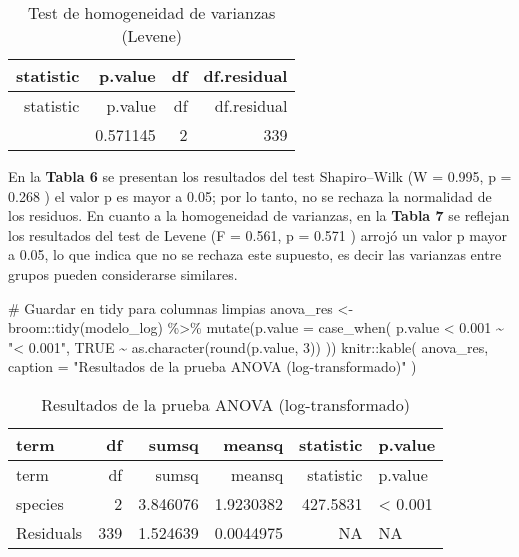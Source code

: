 \documentclass[
  spanish,
  11pt,
  a4paper,
  DIV=11,
  numbers=noendperiod]{scrartcl}
\newenvironment{Shaded}{\begin{snugshade}}{\end{snugshade}}
\newcommand{\AttributeTok}[1]{\textcolor[rgb]{0.40,0.45,0.13}{#1}}
\newcommand{\CommentTok}[1]{\textcolor[rgb]{0.37,0.37,0.37}{#1}}
\newcommand{\ConstantTok}[1]{\textcolor[rgb]{0.56,0.35,0.01}{#1}}
\newcommand{\DecValTok}[1]{\textcolor[rgb]{0.68,0.00,0.00}{#1}}
\newcommand{\FloatTok}[1]{\textcolor[rgb]{0.68,0.00,0.00}{#1}}
\newcommand{\FunctionTok}[1]{\textcolor[rgb]{0.28,0.35,0.67}{#1}}
\newcommand{\NormalTok}[1]{\textcolor[rgb]{0.00,0.23,0.31}{#1}}
\newcommand{\OtherTok}[1]{\textcolor[rgb]{0.00,0.23,0.31}{#1}}
\newcommand{\SpecialCharTok}[1]{\textcolor[rgb]{0.37,0.37,0.37}{#1}}
\newcommand{\StringTok}[1]{\textcolor[rgb]{0.13,0.47,0.30}{#1}}
\begin{document}
\begin{longtable}[]{@{}rrrr@{}}
\caption{Test de homogeneidad de varianzas (Levene)}\tabularnewline
\toprule\noalign{}
statistic & p.value & df & df.residual \\
\midrule\noalign{}
\endfirsthead
\toprule\noalign{}
statistic & p.value & df & df.residual \\
\midrule\noalign{}
\endhead
\bottomrule\noalign{}
\endlastfoot
0.5610386 & 0.571145 & 2 & 339 \\
\end{longtable}

En la \textbf{Tabla 6} se presentan los resultados del test
Shapiro--Wilk (W = 0.995, p = 0.268 ) el valor p es mayor a 0.05; por lo
tanto, no se rechaza la normalidad de los residuos. En cuanto a la
homogeneidad de varianzas, en la \textbf{Tabla 7} se reflejan los
resultados del test de Levene (F = 0.561, p = 0.571 ) arrojó un valor p
mayor a 0.05, lo que indica que no se rechaza este supuesto, es decir
las varianzas entre grupos pueden considerarse similares.

\begin{Shaded}
\begin{Highlighting}[numbers=left,,]
\CommentTok{\# Guardar en tidy para columnas limpias}
\NormalTok{anova\_res }\OtherTok{\textless{}{-}}\NormalTok{ broom}\SpecialCharTok{::}\FunctionTok{tidy}\NormalTok{(modelo\_log) }\SpecialCharTok{\%\textgreater{}\%}
  \FunctionTok{mutate}\NormalTok{(}\AttributeTok{p.value =} \FunctionTok{case\_when}\NormalTok{(}
\NormalTok{    p.value }\SpecialCharTok{\textless{}} \FloatTok{0.001} \SpecialCharTok{\textasciitilde{}} \StringTok{"\textless{} 0.001"}\NormalTok{,}
    \ConstantTok{TRUE} \SpecialCharTok{\textasciitilde{}} \FunctionTok{as.character}\NormalTok{(}\FunctionTok{round}\NormalTok{(p.value, }\DecValTok{3}\NormalTok{))}
\NormalTok{  ))}
\NormalTok{knitr}\SpecialCharTok{::}\FunctionTok{kable}\NormalTok{(}
\NormalTok{  anova\_res,}
  \AttributeTok{caption =} \StringTok{"Resultados de la prueba ANOVA (log{-}transformado)"}
\NormalTok{)}
\end{Highlighting}
\end{Shaded}

\begin{longtable}[]{@{}lrrrrl@{}}
\caption{Resultados de la prueba ANOVA
(log-transformado)}\tabularnewline
\toprule\noalign{}
term & df & sumsq & meansq & statistic & p.value \\
\midrule\noalign{}
\endfirsthead
\toprule\noalign{}
term & df & sumsq & meansq & statistic & p.value \\
\midrule\noalign{}
\endhead
\bottomrule\noalign{}
\endlastfoot
species & 2 & 3.846076 & 1.9230382 & 427.5831 & \textless{} 0.001 \\
Residuals & 339 & 1.524639 & 0.0044975 & NA & NA \\
\end{longtable}
\end{document}
